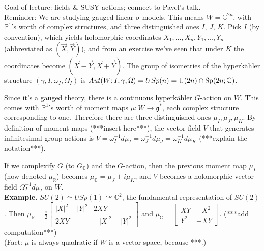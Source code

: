 
Goal of lecture: fields \& SUSY actions; connect to Pavel's talk.\\
Reminder: We are studying gauged linear $\sigma$-models. This means $W=\mathbb C^{2n}$, with $\mathbb P^1$'s worth of complex structures, and three distinguished ones $I$, $J$, $K$. Pick $I$ (by convention), which yields holomorphic coordinates $X_1,\ldots,X_n,Y_1,\ldots,Y_n$ (abbreviated as $(\vec X,\vec Y)$), and from an exercise we've seen that under $K$ the coordinates become $(\vec X-\overline{\vec Y},\vec X+\overline{\vec Y})$. The group of isometries of the hyperk\"ahler structure $(\gamma,I,\omega_I,\Omega_I)$ is $Aut(W;I,\gamma,\Omega)=USp(n)=\mathrm{U}(2n)\cap\mathrm{Sp}(2n;\mathbb C)$.\par
Since it's a gauged theory, there is a continuous hyperk\"ahler $G$-action on $W$. This comes with $\mathbb P^1$'s worth of moment maps $\mu:W\to\mathfrak g^*$, each complex structure corresponding to one. Therefore there are three distinguished ones $\mu_I,\mu_J,\mu_K$. By definition of moment maps (***insert here***), the vector field $V$ that generates infinitesimal group actions is $V=\omega_I^{-1}d\mu_I=\omega_J^{-1}d\mu_J=\omega_K^{-1}d\mu_K$ (***explain the notation***).\par
If we complexify $G$ (to $G_\mathbb C$) and the $G$-action, then the previous moment map $\mu_I$ (now denoted $\mu_\mathbb R$) becomes $\mu_\mathbb C=\mu_J+i\mu_K$, and $V$ becomes a holomorphic vector field $\Omega_I^{-1}d\mu_I$ on $W$.\\
\textbf{Example.} $SU(2)\simeq USp(1)\curvearrowright\mathbb C^2$, the fundamental representation of $SU(2)$. Then $\mu_\mathbb R=\displaystyle\frac i2\begin{bmatrix}|X|^2-|Y|^2&2X\overline Y\\2\overline XY&-|X|^2+|Y|^2\end{bmatrix}$ and $\mu_\mathbb C=\begin{bmatrix}XY&-X^2\\Y^2&-XY\end{bmatrix}$. (***add computation***)\\
(Fact: $\mu$ is always quadratic if $W$ is a vector space,  because ***.)\par
